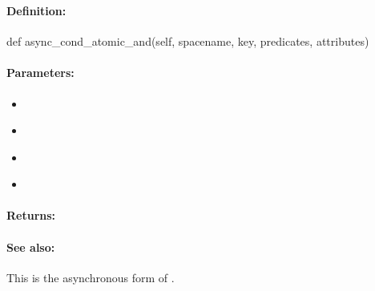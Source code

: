 \pagebreak
\subsubsection{}
\label{api:python:async_cond_atomic_and}


\paragraph{Definition:}
\begin{pythoncode}
def async_cond_atomic_and(self, spacename, key, predicates, attributes)
\end{pythoncode}

\paragraph{Parameters:}
\begin{itemize}[noitemsep]
\item {}\\

\item {}\\

\item {}\\

\item {}\\

\end{itemize}

\paragraph{Returns:}


\paragraph{See also:}  This is the asynchronous form of .

\pagebreak
\subsubsection{}
\label{api:python:atomic_or}



